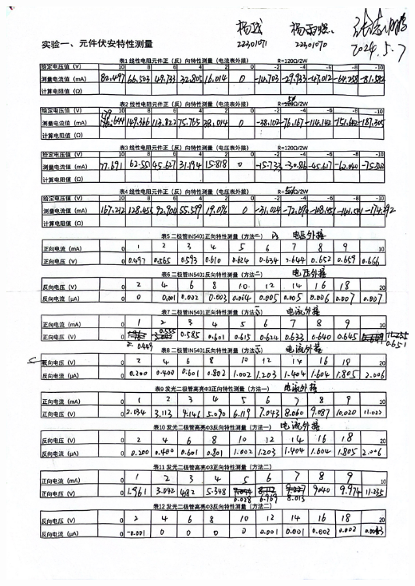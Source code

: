 \documentclass[a4paper]{article}
\begin{document}
\newpage
\begin{center}
    \includegraphics[width=\textwidth]{012}\\
    \newpage

\end{center}
\end{document}

